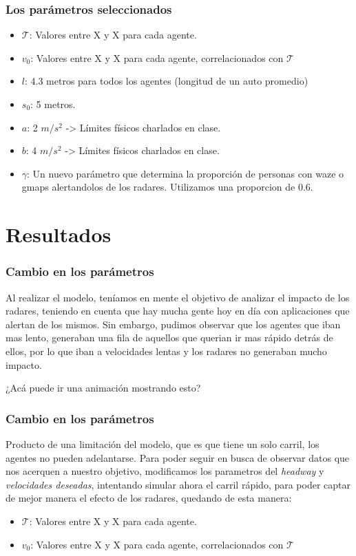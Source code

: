 \documentclass[10pt, compress]{beamer}
\begin{document}
\begin{frame}[fragile]

\frametitle{Los par\'ametros seleccionados}

\begin{itemize}

\item $\mathcal{T}$: Valores entre X y X para cada agente.
\item $v_0$: Valores entre X y X para cada agente, correlacionados con  $\mathcal{T}$
\item $l$: 4.3 metros para todos los agentes (longitud de un auto promedio)
\item $s_0$: 5 metros.
\item $a$: 2 $m/s^2$ -> Límites físicos charlados en clase.
\item $b$: 4 $m/s^2$ -> Límites físicos charlados en clase.
\item $\gamma$: Un nuevo par\'ametro que determina la proporci\'on de personas con waze o gmaps alertandolos de los radares. Utilizamos una proporcion de 0.6.

\end{itemize}

\end{frame}

\section{Resultados}

\begin{frame}
\frametitle{Cambio en los par\'ametros}

Al realizar el modelo, ten\'iamos en mente el objetivo de analizar el impacto de los radares, teniendo en cuenta que hay mucha gente hoy en d\'ia con aplicaciones que alertan de los mismos. Sin embargo, pudimos observar que los agentes que iban mas lento, generaban una fila de aquellos que querian ir mas r\'apido detr\'as de ellos, por lo que iban a velocidades lentas y los radares no generaban mucho impacto.

¿Acá puede ir una animación mostrando esto?


\end{frame}

\begin{frame}
\frametitle{Cambio en los par\'ametros}

Producto de una limitaci\'on del modelo, que es que tiene un solo carril, los agentes no pueden adelantarse. Para poder seguir en busca de observar datos que nos acerquen a nuestro objetivo, modificamos los parametros del \textit{headway} y \textit{velocidades deseadas}, intentando simular ahora el carril r\'apido, para poder captar de mejor manera el efecto de los radares, quedando de esta manera:

\begin{itemize}
\item $\mathcal{T}$: Valores entre X y X para cada agente.
\item $v_0$: Valores entre X y X para cada agente, correlacionados con  $\mathcal{T}$
\end{itemize}

\end{frame}
\end{document}
